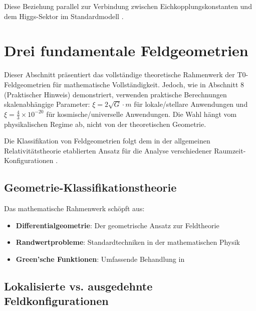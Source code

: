 \documentclass[12pt,a4paper]{article}
\begin{document}
	Diese Beziehung parallel zur Verbindung zwischen Eichkopplungskonstanten und dem Higgs-Sektor im Standardmodell \citep{peskin1995,weinberg2003}.
	
	\section{Drei fundamentale Feldgeometrien}
	\label{sec:three_geometries}
	
	\begin{tcolorbox}[colback=orange!5!white,colframe=orange!75!black,title=Wichtiger methodologischer Hinweis]
		Dieser Abschnitt präsentiert das vollständige theoretische Rahmenwerk der T0-Feldgeometrien für mathematische Vollständigkeit. Jedoch, wie in Abschnitt 8 (Praktischer Hinweis) demonstriert, verwenden praktische Berechnungen skalenabhängige Parameter: $\xi = 2\sqrt{G} \cdot m$ für lokale/stellare Anwendungen und $\xi = \frac{4}{3} \times 10^{-20}$ für kosmische/universelle Anwendungen. Die Wahl hängt vom physikalischen Regime ab, nicht von der theoretischen Geometrie.
	\end{tcolorbox}
	
	Die Klassifikation von Feldgeometrien folgt dem in der allgemeinen Relativitätstheorie etablierten Ansatz für die Analyse verschiedener Raumzeit-Konfigurationen \citep{hawking1973,wald1984}.
	
	\subsection{Geometrie-Klassifikationstheorie}
	\label{subsec:geometry_theory}
	
	Das mathematische Rahmenwerk schöpft aus:
	\begin{itemize}
		\item \textbf{Differentialgeometrie}: Der geometrische Ansatz zur Feldtheorie \citep{misner1973,abraham1988}
		\item \textbf{Randwertprobleme}: Standardtechniken in der mathematischen Physik \citep{stakgold1998,haberman2004}
		\item \textbf{Green'sche Funktionen}: Umfassende Behandlung in \citep{duffy2001,roach1982}
	\end{itemize}
	
	\subsection{Lokalisierte vs. ausgedehnte Feldkonfigurationen}
	\label{subsec:localized_extended}
	
\end{document}
